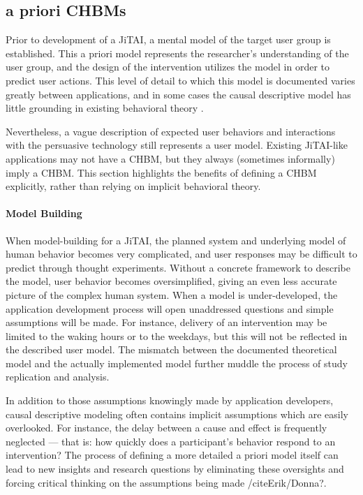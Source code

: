 \documentclass[runningheads,a4paper]{llncs}
\begin{document}
\subsection{a priori CHBMs}
Prior to development of a JiTAI, a mental model of the target user group is established.
This a priori model represents the researcher's understanding of the user group, and the design of the intervention utilizes the model in order to predict user actions.
This level of detail to which this model is documented varies greatly between applications, and in some cases the causal descriptive model has little grounding in existing behavioral theory \cite{prestwich2014does}.


Nevertheless, a vague description of expected user behaviors and interactions with the persuasive technology still represents a user model.
Existing JiTAI-like applications may not have a CHBM, but they always (sometimes informally) imply a CHBM.
This section highlights the benefits of defining a CHBM explicitly, rather than relying on implicit behavioral theory.
\paragraph{Model Building}
When model-building for a JiTAI, the planned system and underlying model of human behavior becomes very complicated, and user responses may be difficult to predict through thought experiments.
Without a concrete framework to describe the model, user behavior becomes oversimplified, giving an even less accurate picture of the complex human system.
When a model is under-developed, the application development process will open unaddressed questions and simple assumptions will be made.
For instance, delivery of an intervention may be limited to the waking hours or to the weekdays, but this will not be reflected in the described user model.
The mismatch between the documented theoretical model and the actually implemented model further muddle the process of study replication and analysis.

In addition to those assumptions knowingly made by application developers, causal descriptive modeling often contains implicit assumptions which are easily overlooked.
For instance, the delay between a cause and effect is frequently neglected --- that is: how quickly does a participant's behavior respond to an intervention?
The process of defining a more detailed a priori model itself can lead to new insights and research questions by eliminating these oversights and forcing critical thinking on the assumptions being made /cite{Erik/Donna?}.
\end{document}
